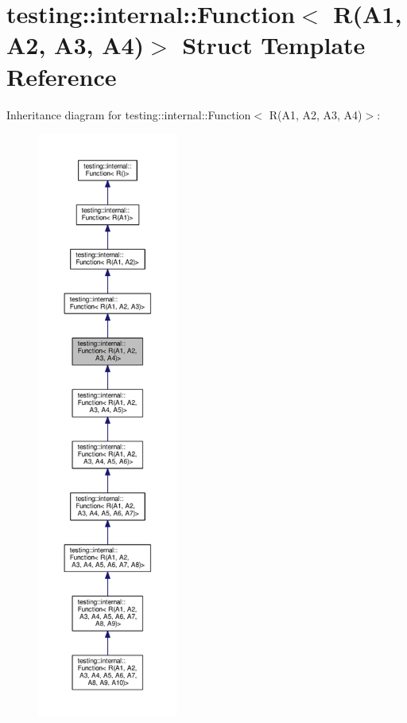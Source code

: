 \hypertarget{structtesting_1_1internal_1_1Function_3_01R_07A1_00_01A2_00_01A3_00_01A4_08_4}{}\section{testing\+:\+:internal\+:\+:Function$<$ R(A1, A2, A3, A4)$>$ Struct Template Reference}
\label{structtesting_1_1internal_1_1Function_3_01R_07A1_00_01A2_00_01A3_00_01A4_08_4}


Inheritance diagram for testing\+:\+:internal\+:\+:Function$<$ R(A1, A2, A3, A4)$>$\+:\nopagebreak
\begin{figure}[H]
\begin{center}
\leavevmode
\includegraphics[height=550pt]{structtesting_1_1internal_1_1Function_3_01R_07A1_00_01A2_00_01A3_00_01A4_08_4__inherit__graph}
\end{center}
\end{figure}


